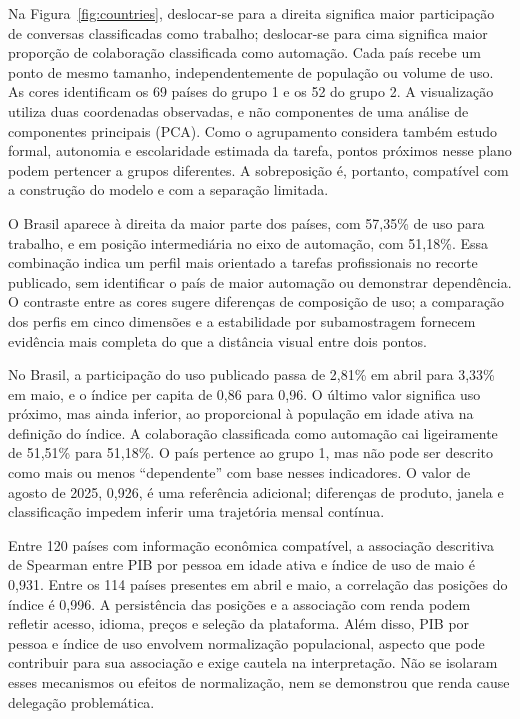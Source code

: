 \documentclass[11pt,a4paper]{article}
\begin{document}
Na Figura~\ref{fig:countries}, deslocar-se para a direita significa maior participação de conversas classificadas como trabalho; deslocar-se para cima significa maior proporção de colaboração classificada como automação. Cada país recebe um ponto de mesmo tamanho, independentemente de população ou volume de uso. As cores identificam os 69 países do grupo 1 e os 52 do grupo 2. A visualização utiliza duas coordenadas observadas, e não componentes de uma análise de componentes principais (PCA). Como o agrupamento considera também estudo formal, autonomia e escolaridade estimada da tarefa, pontos próximos nesse plano podem pertencer a grupos diferentes. A sobreposição é, portanto, compatível com a construção do modelo e com a separação limitada.

O Brasil aparece à direita da maior parte dos países, com 57,35\% de uso para trabalho, e em posição intermediária no eixo de automação, com 51,18\%. Essa combinação indica um perfil mais orientado a tarefas profissionais no recorte publicado, sem identificar o país de maior automação ou demonstrar dependência. O contraste entre as cores sugere diferenças de composição de uso; a comparação dos perfis em cinco dimensões e a estabilidade por subamostragem fornecem evidência mais completa do que a distância visual entre dois pontos.

No Brasil, a participação do uso publicado passa de 2,81\% em abril para 3,33\% em maio, e o índice per capita de 0,86 para 0,96. O último valor significa uso próximo, mas ainda inferior, ao proporcional à população em idade ativa na definição do índice. A colaboração classificada como automação cai ligeiramente de 51,51\% para 51,18\%. O país pertence ao grupo 1, mas não pode ser descrito como mais ou menos ``dependente'' com base nesses indicadores. O valor de agosto de 2025, 0,926, é uma referência adicional; diferenças de produto, janela e classificação impedem inferir uma trajetória mensal contínua.

Entre 120 países com informação econômica compatível, a associação descritiva de Spearman entre PIB por pessoa em idade ativa e índice de uso de maio é 0,931. Entre os 114 países presentes em abril e maio, a correlação das posições do índice é 0,996. A persistência das posições e a associação com renda podem refletir acesso, idioma, preços e seleção da plataforma. Além disso, PIB por pessoa e índice de uso envolvem normalização populacional, aspecto que pode contribuir para sua associação e exige cautela na interpretação. Não se isolaram esses mecanismos ou efeitos de normalização, nem se demonstrou que renda cause delegação problemática.
\end{document}

